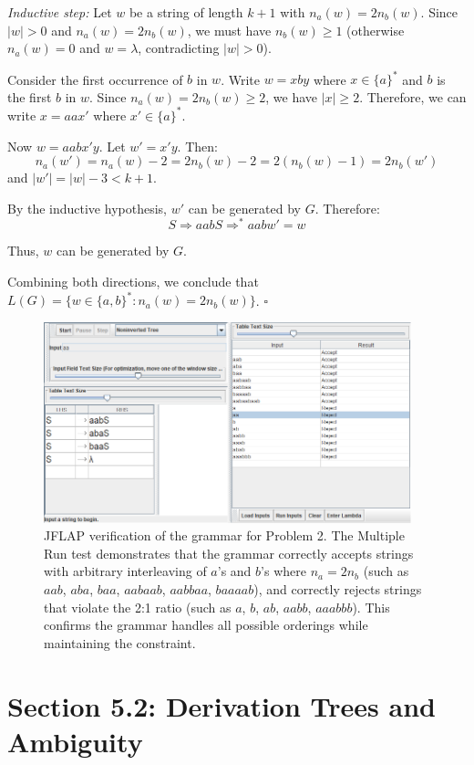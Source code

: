 \documentclass[12pt]{article}
\begin{document}
\textit{Inductive step:} Let $w$ be a string of length $k+1$ with $n_a(w) = 2n_b(w)$. Since $|w| > 0$ and $n_a(w) = 2n_b(w)$, we must have $n_b(w) \ge 1$ (otherwise $n_a(w) = 0$ and $w = \lambda$, contradicting $|w| > 0$).

Consider the first occurrence of $b$ in $w$. Write $w = xby$ where $x \in \{a\}^*$ and $b$ is the first $b$ in $w$. Since $n_a(w) = 2n_b(w) \ge 2$, we have $|x| \ge 2$. Therefore, we can write $x = aax'$ where $x' \in \{a\}^*$.

Now $w = aabx'y$. Let $w' = x'y$. Then:
$$n_a(w') = n_a(w) - 2 = 2n_b(w) - 2 = 2(n_b(w) - 1) = 2n_b(w')$$
and $|w'| = |w| - 3 < k+1$.

By the inductive hypothesis, $w'$ can be generated by $G$. Therefore:
$$S \Rightarrow aabS \Rightarrow^* aabw' = w$$

Thus, $w$ can be generated by $G$.

Combining both directions, we conclude that $L(G) = \{w \in \{a,b\}^* : n_a(w) = 2n_b(w)\}$. $\square$

\begin{figure}[H]
\centering
\includegraphics[width=0.95\textwidth]{Problem 2/Problem 2.png}
\caption{JFLAP verification of the grammar for Problem 2. The Multiple Run test demonstrates that the grammar correctly accepts strings with arbitrary interleaving of $a$'s and $b$'s where $n_a = 2n_b$ (such as $aab$, $aba$, $baa$, $aabaab$, $aabbaa$, $baaaab$), and correctly rejects strings that violate the 2:1 ratio (such as $a$, $b$, $ab$, $aabb$, $aaabbb$). This confirms the grammar handles all possible orderings while maintaining the constraint.}
\label{fig:problem2}
\end{figure}

\newpage

\section{Section 5.2: Derivation Trees and Ambiguity}
\end{document}
